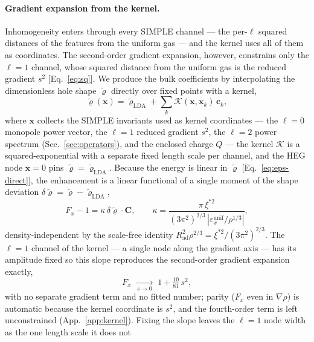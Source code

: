 \documentclass[aps,prb,reprint,superscriptaddress,nofootinbib]{revtex4-2}
\newcommand{\Rad}{R_{\mathrm{ad}}}
\begin{document}
\paragraph*{Gradient expansion from the kernel.}
Inhomogeneity enters through every SIMPLE channel --- the per-$\ell$ squared distances of the
features from the uniform gas --- and the kernel uses all of them as coordinates. The second-order
gradient expansion, however, constrains only the $\ell=1$ channel, whose squared distance from the
uniform gas is the reduced gradient $s^2$ [Eq.~\eqref{eq:sq}]. We produce the bulk coefficients by
interpolating the dimensionless hole shape $\tilde{\bm\varrho}$ directly over
fixed points with a kernel,
\begin{equation}
\label{eq:kernel-map}
\tilde{\bm\varrho}(\mathbf x)=\tilde{\bm\varrho}_{\mathrm{LDA}}+\sum_k \mathcal K(\mathbf x,\mathbf x_k)\,\mathbf c_k ,
\end{equation}
where $\mathbf x$ collects the SIMPLE invariants used as kernel coordinates --- the $\ell=0$ monopole
power vector, the $\ell=1$ reduced gradient $s^2$, the $\ell=2$ power spectrum
(Sec.~\ref{sec:operators}), and the enclosed charge $Q$ --- the kernel $\mathcal K$ is a
squared-exponential with a separate fixed length scale per channel, and the HEG node $\mathbf x=0$ pins
$\tilde{\bm\varrho}=\tilde{\bm\varrho}_{\mathrm{LDA}}$.
Because the energy is linear in $\tilde{\bm\varrho}$ [Eq.~\eqref{eq:eps-direct}], the enhancement is a
linear functional of a single moment of the shape deviation
$\delta\tilde{\bm\varrho}=\tilde{\bm\varrho}-\tilde{\bm\varrho}_{\mathrm{LDA}}$,
\begin{equation}
\label{eq:Fx-kernel}
F_x-1=\kappa\,\delta\tilde{\bm\varrho}\!\cdot\!\mathbf C,\qquad
\kappa=\frac{\pi\,\xi^{*2}}{(3\pi^2)^{2/3}\,|\varepsilon_x^{\mathrm{unif}}/\rho^{1/3}|},
\end{equation}
density-independent by the scale-free identity $\Rad^2\rho^{2/3}=\xi^{*2}/(3\pi^2)^{2/3}$. The
$\ell=1$ channel of the kernel --- a single node along the gradient axis --- has its amplitude
fixed so this slope reproduces the second-order gradient expansion exactly,
\begin{equation}
\label{eq:fx}
F_x\;\xrightarrow[\,s\to0\,]{}\;1+\tfrac{10}{81}\,s^2 ,
\end{equation}
with no separate gradient term and no fitted number; parity ($F_x$ even in $\nabla\rho$) is
automatic because the kernel coordinate is $s^2$, and the fourth-order term is left unconstrained
(App.~\ref{app:kernel}). Fixing the slope leaves the $\ell=1$ node width as the one length scale it does not
\end{document}

